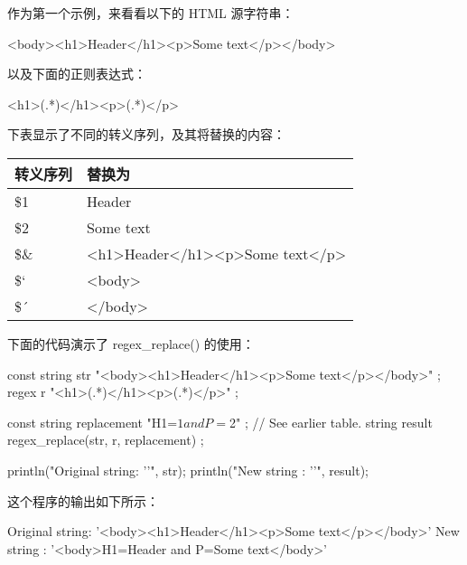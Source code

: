 
作为第一个示例，来看看以下的 HTML 源字符串：

\begin{shell}
<body><h1>Header</h1><p>Some text</p></body>
\end{shell}

以及下面的正则表达式：

\begin{cpp}
<h1>(.*)</h1><p>(.*)</p>
\end{cpp}

下表显示了不同的转义序列，及其将替换的内容：

\begin{longtable}{|l|l|}
\hline
\textbf{转义序列} & \textbf{替换为}         \\ \hline
\endfirsthead
%
\endhead
%
\$1                      & Header                         \\ \hline
\$2                      & Some text                      \\ \hline
\$\& & \textless{}h1\textgreater{}Header\textless{}/h1\textgreater{}\textless{}p\textgreater{}Some text\textless{}/p\textgreater{} \\ \hline
\$`                      & \textless{}body\textgreater{}  \\ \hline
\$´                      & \textless{}/body\textgreater{} \\ \hline
\end{longtable}

下面的代码演示了 regex\_replace() 的使用：

\begin{cpp}
const string str { "<body><h1>Header</h1><p>Some text</p></body>" };
regex r { "<h1>(.*)</h1><p>(.*)</p>" };

const string replacement { "H1=$1 and P=$2" }; // See earlier table.
string result { regex_replace(str, r, replacement) };

println("Original string: '{}'", str);
println("New string : '{}'", result);
\end{cpp}

这个程序的输出如下所示：

\begin{shell}
Original string: '<body><h1>Header</h1><p>Some text</p></body>'
New string     : '<body>H1=Header and P=Some text</body>'
\end{shell}


